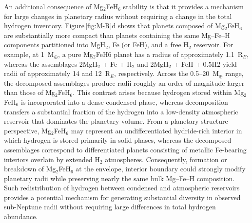 \documentclass[draft,jgrga,12pt]{agujournal2019}
\begin{document}
An additional consequence of Mg$_2$FeH$_6$ stability is that it provides a mechanism for large changes in planetary radius without requiring a change in the total hydrogen inventory.
Figure\,\ref{fig:M-R}d shows that planets composed of Mg$_2$FeH$_6$ are substantially more compact than planets containing the same Mg--Fe--H components partitioned into MgH$_2$, Fe (or FeH), and a free H$_2$ reservoir.
For example, at 1~M$_{\oplus}$, a pure Mg$_2$FeH$6$ planet has a radius of approximately 1.1~R$_E$, whereas the assemblages 2MgH$_2$ + Fe + H$_2$ and 2MgH$_2$ + FeH + 0.5H$2$ yield radii of approximately 14 and 12~R$_E$, respectively.
Across the 0.5--20~M$_{\oplus}$ range, the decomposed assemblages produce radii roughly an order of magnitude larger than those of Mg$_2$FeH$_6$.
This contrast arises because hydrogen stored within Mg$_2$FeH$_6$ is incorporated into a dense condensed phase, whereas decomposition transfers a substantial fraction of the hydrogen into a low-density atmospheric reservoir that dominates the planetary volume.
From a planetary structure perspective, Mg$_2$FeH$_6$ may represent an undifferentiated hydride-rich interior in which hydrogen is stored primarily in solid phases, whereas the decomposed assemblages correspond to differentiated planets consisting of metallic Fe-bearing interiors overlain by extended H$_2$ atmospheres.
Consequently, formation or breakdown of Mg$_2$FeH$_6$ at the envelope, interior boundary could strongly modify planetary radii while preserving nearly the same bulk Mg--Fe--H composition.
Such redistribution of hydrogen between condensed and atmospheric reservoirs provides a potential mechanism for generating substantial diversity in observed sub-Neptune radii without requiring large differences in total hydrogen abundance.


\end{document}
